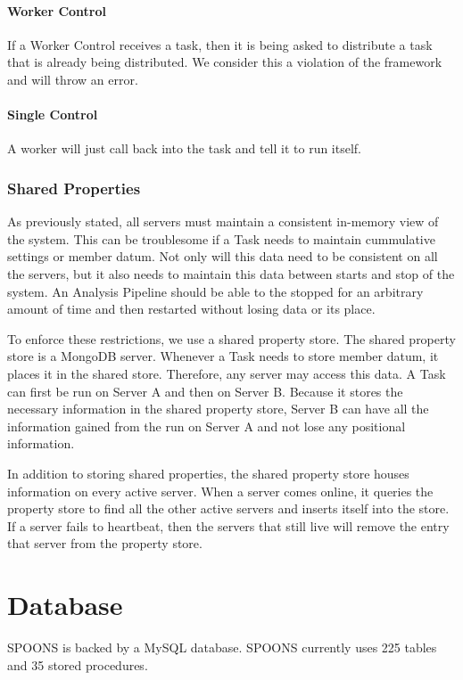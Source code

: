 \documentclass[12pt]{ucthesis}
\begin{document}
\paragraph{Worker Control}
If a Worker Control receives a task, then it is being asked to distribute a task that is already being distributed.
We consider this a violation of the framework and will throw an error.

\paragraph{Single Control}
A worker will just call back into the task and tell it to run itself.

\subsubsection{Shared Properties}
\label{arch-props}
As previously stated, all servers must maintain a consistent in-memory view of the system.
This can be troublesome if a Task needs to maintain cummulative settings or member datum.
Not only will this data need to be consistent on all the servers, but it also needs to maintain this
data between starts and stop of the system. An Analysis Pipeline should be able to the stopped for an arbitrary amount
of time and then restarted without losing data or its place.

To enforce these restrictions, we use a shared property store. The shared property store is a MongoDB server.
Whenever a Task needs to store member datum, it places it in the shared store. Therefore, any server may access this data.
A Task can first be run on Server A and then on Server B. Because it stores the necessary information in the shared
property store, Server B can have all the information gained from the run on Server A and not lose any positional information.

In addition to storing shared properties, the shared property store houses information on every active server.
When a server comes online, it queries the property store to find all the other active servers and inserts itself into
the store. If a server fails to heartbeat, then the servers that still live will remove the entry that server from the property store.

\section{Database}
\label{arch-database}
SPOONS is backed by a MySQL database. SPOONS currently uses 225 tables and 35 stored procedures.
\end{document}
